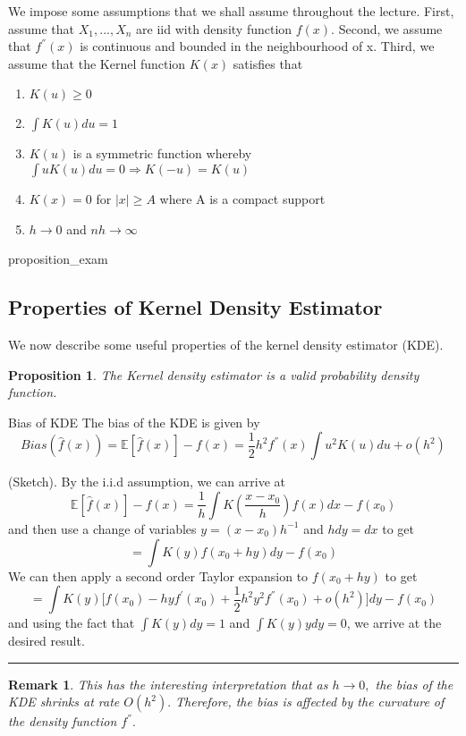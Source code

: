 \documentclass[twoside]{article}
\newtheorem{proposition}[theorem]{Proposition}
\newtheorem{remark}[theorem]{Remark}
\newenvironment{proof}{{\bf Proof:}}{\hfill\rule{2mm}{2mm}}
\begin{document}
We impose some assumptions that we shall assume throughout the lecture. First, assume that $X_1, ..., X_n$ are iid with density function $f(x).$ Second, we assume that $f^{''}(x)$ is continuous and bounded in the neighbourhood of x. Third, we assume that the Kernel function $K(x)$ satisfies that 
\begin{enumerate}
\item $K(u) \geq 0$
\item $\int K(u)du = 1$
\item $K(u)$ is a symmetric function whereby $\int uK(u)du = 0 \Rightarrow K(-u) = K(u)$ 
\item $K(x) = 0$ for $|x| \geq A$ where A is a compact support
\item $h \rightarrow 0$ and $nh \rightarrow \infty$
\end{enumerate}
{proposition_exam}

\subsection{Properties of Kernel Density Estimator}
We now describe some useful properties of the kernel density estimator (KDE).
\begin{proposition} The Kernel density estimator is a valid probability density function.
\end{proposition}

\begin{proposition_exam}{Bias of KDE}{} The bias of the KDE is given by 
\begin{equation}
Bias(\hat{f}(x)) = \mathbb{E}[\hat{f}(x)] - f(x) = \frac{1}{2}h^{2}f^{''}(x)\int u^2K(u)du + o(h^2)
\end{equation}
\end{proposition_exam}

\begin{proof} (Sketch). By the i.i.d assumption, we can arrive at 
$$
\mathbb{E}[\hat{f}(x)] - f(x) = \frac{1}{h}\int K(\frac{x - x_0}{h})f(x)dx - f(x_0)
$$
and then use a change of variables $y = (x - x_0)h^{-1}$ and $hdy = dx$ to get 
$$
= \int K(y)f(x_0 + hy)dy - f(x_0)
$$
We can then apply a second order Taylor expansion to $f(x_0 + hy)$ to get 
$$
= \int K(y)\big[f(x_0) - hyf^{'}(x_0) + \frac{1}{2}h^2y^2f^{''}(x_0) + o(h^2) \big]dy - f(x_0)
$$
and using the fact that $\int K(y)dy = 1$ and $\int K(y)ydy = 0$, we arrive at the desired result.
\end{proof}

\begin{remark} This has the interesting interpretation that as $h \rightarrow 0,$ the bias of the KDE shrinks at rate $O(h^2).$ Therefore, the bias is affected by the curvature of the density function $f^{''}.$
\end{remark}
\end{document}
